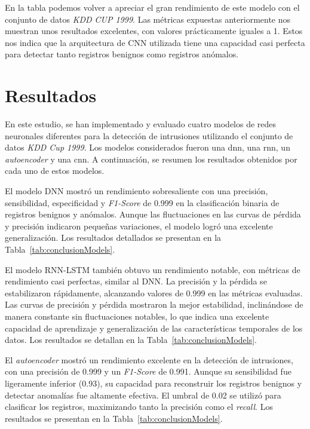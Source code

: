 En la tabla podemos volver a apreciar el gran rendimiento de este modelo con el conjunto de datos \textit{KDD CUP 1999}. Las métricas expuestas anteriormente nos muestran unos resultados excelentes, con valores prácticamente iguales a 1. Estos nos indica que la arquitectura de CNN utilizada tiene una capacidad casi perfecta para detectar tanto registros benignos como registros anómalos. 







\section{Resultados}


En este estudio, se han implementado y evaluado cuatro modelos de redes neuronales diferentes para la detección de intrusiones utilizando el conjunto de datos \textit{KDD Cup 1999}. Los modelos considerados fueron una \acrfull{dnn}, una \acrfull{rnn}, un \textit{autoencoder} y una \acrfull{cnn}. A continuación, se resumen los resultados obtenidos por cada uno de estos modelos.

El modelo DNN mostró un rendimiento sobresaliente con una precisión, sensibilidad, especificidad y \textit{F1-Score} de 0.999 en la clasificación binaria de registros benignos y anómalos. Aunque las fluctuaciones en las curvas de pérdida y precisión indicaron pequeñas variaciones, el modelo logró una excelente generalización. Los resultados detallados se presentan en la Tabla~\ref{tab:conclusionModels}.

El modelo RNN-LSTM también obtuvo un rendimiento notable, con métricas de rendimiento casi perfectas, similar al DNN. La precisión y la pérdida se estabilizaron rápidamente, alcanzando valores de 0.999 en las métricas evaluadas. Las curvas de precisión y pérdida mostraron la mejor estabilidad, inclinándose de manera constante sin fluctuaciones notables, lo que indica una excelente capacidad de aprendizaje y generalización de las características temporales de los datos. Los resultados se detallan en la Tabla~\ref{tab:conclusionModels}.

El \textit{autoencoder} mostró un rendimiento excelente en la detección de intrusiones, con una precisión de 0.999 y un \textit{F1-Score} de 0.991. Aunque su sensibilidad fue ligeramente inferior (0.93), su capacidad para reconstruir los registros benignos y detectar anomalías fue altamente efectiva. El umbral de 0.02 se utilizó para clasificar los registros, maximizando tanto la precisión como el \textit{recall}. Los resultados se presentan en la Tabla~\ref{tab:conclusionModels}.

